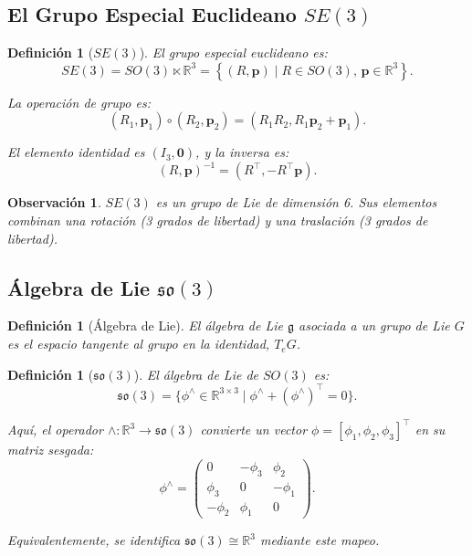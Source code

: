 \documentclass[11pt,a4paper]{article}
\newtheorem{definition}[theorem]{Definición}
\newtheorem{remark}[theorem]{Observación}
\begin{document}
\subsection{El Grupo Especial Euclideano $SE(3)$}

\begin{definition}[$SE(3)$]
El grupo especial euclideano es:
\begin{equation}
    SE(3) = SO(3) \ltimes \mathbb{R}^3 = \left\{ (R, \mathbf{p}) \mid R \in SO(3), \, \mathbf{p} \in \mathbb{R}^3 \right\}.
\end{equation}

La operación de grupo es:
\begin{equation}
    (R_1, \mathbf{p}_1) \circ (R_2, \mathbf{p}_2) = (R_1 R_2, R_1 \mathbf{p}_2 + \mathbf{p}_1).
\end{equation}

El elemento identidad es $(I_3, \mathbf{0})$, y la inversa es:
\begin{equation}
    (R, \mathbf{p})^{-1} = (R^\top, -R^\top \mathbf{p}).
\end{equation}
\end{definition}

\begin{remark}
$SE(3)$ es un grupo de Lie de dimensión 6. Sus elementos combinan una rotación (3 grados de libertad) y una traslación (3 grados de libertad).
\end{remark}

\subsection{Álgebra de Lie $\mathfrak{so}(3)$}

\begin{definition}[Álgebra de Lie]
El \emph{álgebra de Lie} $\mathfrak{g}$ asociada a un grupo de Lie $G$ es el espacio tangente al grupo en la identidad, $T_e G$.
\end{definition}

\begin{definition}[$\mathfrak{so}(3)$]
El álgebra de Lie de $SO(3)$ es:
\begin{equation}
    \mathfrak{so}(3) = \{ \phi^\wedge \in \mathbb{R}^{3 \times 3} \mid \phi^\wedge + (\phi^\wedge)^\top = 0 \}.
\end{equation}

Aquí, el operador $\wedge : \mathbb{R}^3 \to \mathfrak{so}(3)$ convierte un vector $\phi = [\phi_1, \phi_2, \phi_3]^\top$ en su matriz sesgada:
\begin{equation}
    \phi^\wedge = \begin{pmatrix}
        0 & -\phi_3 & \phi_2 \\
        \phi_3 & 0 & -\phi_1 \\
        -\phi_2 & \phi_1 & 0
    \end{pmatrix}.
\end{equation}

Equivalentemente, se identifica $\mathfrak{so}(3) \cong \mathbb{R}^3$ mediante este mapeo.
\end{definition}
\end{document}
